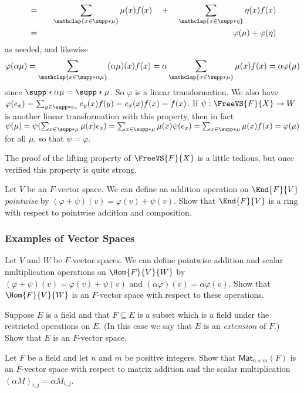 \begin{theproof}
\begin{eqnarray*}
 & = & \quad \sum_{\mathclap{x \in \supp*{\mu}}} \mu(x)f(x) \quad + \quad \sum_{\mathclap{x \in \supp*{\eta}}} \eta(x)f(x) \\ 
 & = & \varphi(\mu) + \varphi(\eta)
\end{eqnarray*}
as needed, and likewise \[ \varphi(\alpha\mu) = \sum_{\mathclap{x \in \supp*{\alpha\mu}}} (\alpha\mu)(x)f(x) = \alpha \sum_{\mathclap{x \in \supp*{\mu}}} \mu(x)f(x) = \alpha\varphi(\mu) \] since $\supp*{\alpha\mu} = \supp*{\mu}$. So $\varphi$ is a linear transformation. We also have $\varphi(e_x) = \sum_{y \in \supp*{e_x}} e_y(x)f(y) = e_x(x)f(x) = f(x)$. If $\psi : \FreeVS{F}{X} \rightarrow W$ is another linear transformation with this property, then in fact $\psi(\mu) = \psi(\sum_{x \in \supp*{\mu}} \mu(x)e_x) = \sum_{x \in \supp*{\mu}} \mu(x) \psi(e_x) = \sum_{x \in \supp*{\mu}} \mu(x) f(x) = \varphi(\mu)$ for all $\mu$, so that $\psi = \varphi$.
\end{theproof}

The proof of the lifting property of $\FreeVS{F}{X}$ is a little tedious, but once verified this property is quite strong.

\NowForSomeExercises

\begin{exercises}
\item Let $V$ be an $F$-vector space. We can define an addition operation on $\End{F}{V}$ \emph{pointwise} by $(\varphi+\psi)(v) = \varphi(v) + \psi(v)$. Show that $\End{F}{V}$ is a ring with respect to pointwise addition and composition.
\PauseExercises
\end{exercises}

\subsubsection*{Examples of Vector Spaces}

\begin{exercises}
\ResumeExercises
\item{\label{exr:hom-is-vec-spa}}
Let $V$ and $W$ be $F$-vector spaces. We can define pointwise addition and scalar multiplication operations on $\Hom{F}{V}{W}$ by $(\varphi+\psi)(v) = \varphi(v) + \psi(v)$ and $(\alpha\varphi)(v) = \alpha \varphi(v)$. Show that $\Hom{F}{V}{W}$ is an $F$-vector space with respect to these operations.

\item{\label{exr:field-ext-is-vec-spa}}
Suppose $E$ is a field and that $F \subseteq E$ is a subset which is a field under the restricted operations on $E$. (In this case we say that $E$ is an \emph{extension} of $F$.) Show that $E$ is an $F$-vector space.

\item{\label{exr:mat-is-vec-spa}}
Let $F$ be a field and let $n$ and $m$ be positive integers. Show that $\mathsf{Mat}_{n \times m}(F)$ is an $F$-vector space with respect to matrix addition and the scalar multiplication $(\alpha M)_{i,j} = \alpha M_{i,j}$.

\PauseExercises
\end{exercises}

